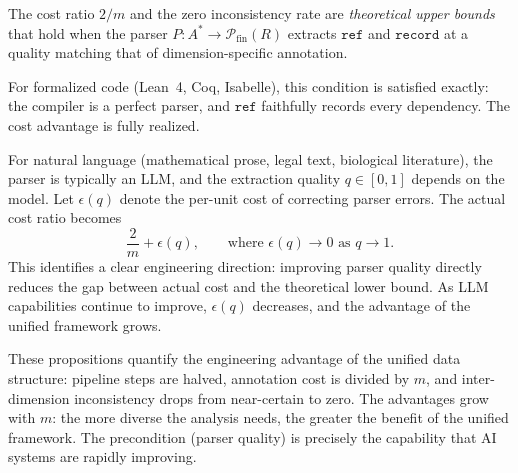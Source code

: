 \begin{remark}
\label{rem:parser-quality}
The cost ratio $2/m$ and the zero inconsistency rate are \emph{theoretical upper bounds} that hold when the parser $P : A^* \to \mathcal{P}_{\mathrm{fin}}(R)$ extracts $\texttt{ref}$ and $\texttt{record}$ at a quality matching that of dimension-specific annotation.

For formalized code (Lean~4, Coq, Isabelle), this condition is satisfied exactly: the compiler is a perfect parser, and $\texttt{ref}$ faithfully records every dependency. The cost advantage is fully realized.

For natural language (mathematical prose, legal text, biological literature), the parser is typically an LLM, and the extraction quality $q \in [0, 1]$ depends on the model. Let $\epsilon(q)$ denote the per-unit cost of correcting parser errors. The actual cost ratio becomes
\[
\frac{2}{m} + \epsilon(q), \qquad \text{where } \epsilon(q) \to 0 \text{ as } q \to 1.
\]
This identifies a clear engineering direction: improving parser quality directly reduces the gap between actual cost and the theoretical lower bound. As LLM capabilities continue to improve, $\epsilon(q)$ decreases, and the advantage of the unified framework grows.
\end{remark}

\begin{remark}[Summary]
These propositions quantify the engineering advantage of the unified data structure: pipeline steps are halved, annotation cost is divided by $m$, and inter-dimension inconsistency drops from near-certain to zero. The advantages grow with $m$: the more diverse the analysis needs, the greater the benefit of the unified framework. The precondition (parser quality) is precisely the capability that AI systems are rapidly improving.
\end{remark}
